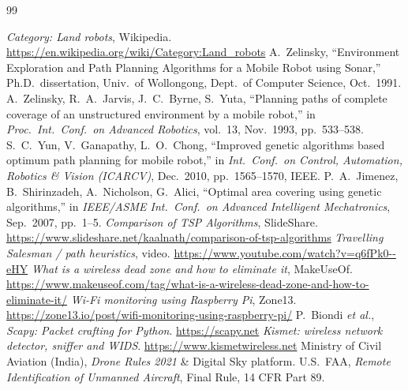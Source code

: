 \begin{thebibliography}{99}
\small
{} \emph{Category: Land robots}, Wikipedia. \url{https://en.wikipedia.org/wiki/Category:Land_robots}
 A.~Zelinsky, ``Environment Exploration and Path Planning Algorithms for a Mobile Robot using Sonar,'' Ph.D.\ dissertation, Univ.\ of Wollongong, Dept.\ of Computer Science, Oct.\ 1991.
 A.~Zelinsky, R.~A.~Jarvis, J.~C.~Byrne, S.~Yuta, ``Planning paths of complete coverage of an unstructured environment by a mobile robot,'' in \emph{Proc.\ Int.\ Conf.\ on Advanced Robotics}, vol.~13, Nov.\ 1993, pp.~533--538.
 S.~C.~Yun, V.~Ganapathy, L.~O.~Chong, ``Improved genetic algorithms based optimum path planning for mobile robot,'' in \emph{Int.\ Conf.\ on Control, Automation, Robotics \& Vision (ICARCV)}, Dec.\ 2010, pp.~1565--1570, IEEE.
 P.~A.~Jimenez, B.~Shirinzadeh, A.~Nicholson, G.~Alici, ``Optimal area covering using genetic algorithms,'' in \emph{IEEE/ASME Int.\ Conf.\ on Advanced Intelligent Mechatronics}, Sep.\ 2007, pp.~1--5.
 \emph{Comparison of TSP Algorithms}, SlideShare. \url{https://www.slideshare.net/kaalnath/comparison-of-tsp-algorithms}
 \emph{Travelling Salesman / path heuristics}, video. \url{https://www.youtube.com/watch?v=q6fPk0--eHY}
 \emph{What is a wireless dead zone and how to eliminate it}, MakeUseOf. \url{https://www.makeuseof.com/tag/what-is-a-wireless-dead-zone-and-how-to-eliminate-it/}
 \emph{Wi-Fi monitoring using Raspberry Pi}, Zone13. \url{https://zone13.io/post/wifi-monitoring-using-raspberry-pi/}
 P.~Biondi \emph{et al.}, \emph{Scapy: Packet crafting for Python}. \url{https://scapy.net}
 \emph{Kismet: wireless network detector, sniffer and WIDS}. \url{https://www.kismetwireless.net}
 Ministry of Civil Aviation (India), \emph{Drone Rules 2021} \& Digital Sky platform.
 U.S.\ FAA, \emph{Remote Identification of Unmanned Aircraft}, Final Rule, 14 CFR Part 89.
\end{thebibliography}
